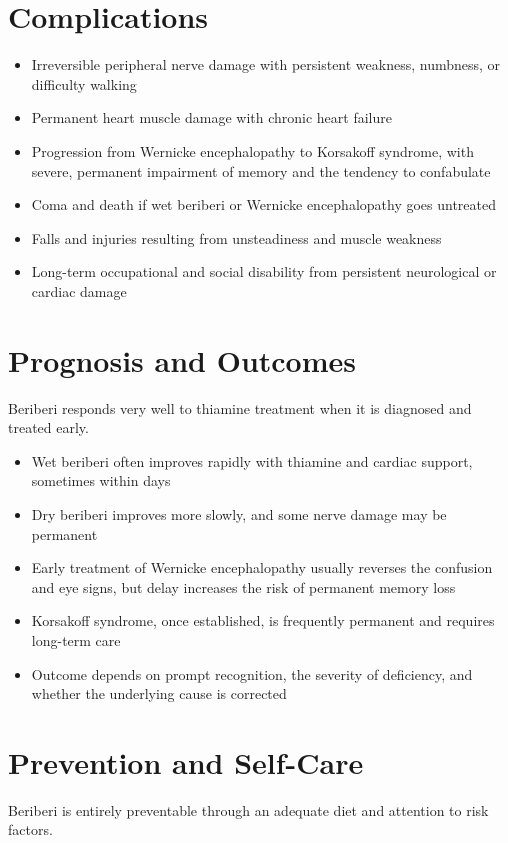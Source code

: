 \section*{Complications}
\begin{itemize}
    \item Irreversible peripheral nerve damage with persistent weakness, numbness, or difficulty walking
    \item Permanent heart muscle damage with chronic heart failure
    \item Progression from Wernicke encephalopathy to Korsakoff syndrome, with severe, permanent impairment of memory and the tendency to confabulate
    \item Coma and death if wet beriberi or Wernicke encephalopathy goes untreated
    \item Falls and injuries resulting from unsteadiness and muscle weakness
    \item Long-term occupational and social disability from persistent neurological or cardiac damage
\end{itemize}

\section*{Prognosis and Outcomes}
Beriberi responds very well to thiamine treatment when it is diagnosed and treated early.

\begin{itemize}
    \item Wet beriberi often improves rapidly with thiamine and cardiac support, sometimes within days
    \item Dry beriberi improves more slowly, and some nerve damage may be permanent
    \item Early treatment of Wernicke encephalopathy usually reverses the confusion and eye signs, but delay increases the risk of permanent memory loss
    \item Korsakoff syndrome, once established, is frequently permanent and requires long-term care
    \item Outcome depends on prompt recognition, the severity of deficiency, and whether the underlying cause is corrected
\end{itemize}

\section*{Prevention and Self-Care}
Beriberi is entirely preventable through an adequate diet and attention to risk factors.

